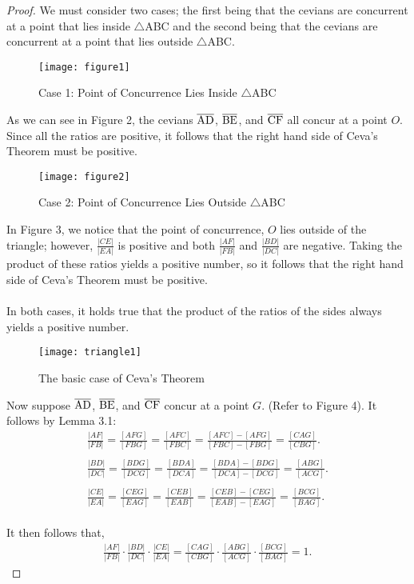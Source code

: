\documentclass[12pt,a4paper,reqno,parskip=full]{amsart}
\numberwithin{equation}{section}
\theoremstyle{plain}
\theoremstyle{definition}
\begin{document}
\begin{proof}
We must consider two cases; the first being that the cevians are concurrent at a point that lies inside $\triangle$ABC and the second being that the cevians are concurrent at a point that lies outside $\triangle$ABC.
\begin{figure}[H]
    \centering
    \texttt{[image: figure1]}
    \caption{Case 1: Point of Concurrence Lies Inside $\triangle$ABC}
    \label{fig:figure1}
\end{figure}

As we can see in Figure 2, the cevians $\overline{\rm AD}$, $\overline{\rm BE}$, and $\overline{\rm CF}$ all concur at a point $O$. Since all the ratios are positive, it follows that the right hand side of Ceva's Theorem must be positive.
\begin{figure}[H]
    \centering
    \texttt{[image: figure2]}
    \caption{Case 2: Point of Concurrence Lies Outside $\triangle$ABC}
    \label{fig:figure2}
\end{figure}

In Figure 3, we notice that the point of concurrence, $O$ lies outside of the triangle; however, $\frac{|CE|}{|EA|}$ is positive and both $\frac{|AF|}{|FB|}$ and $\frac{|BD|}{|DC|}$ are negative. Taking the product of these ratios yields a positive number, so it follows that the right hand side of Ceva's Theorem must be positive.
\\
\\
In both cases, it holds true that the product of the ratios of the sides always yields a positive number.
\\
\begin{figure}[H]
    \centering
    \texttt{[image: triangle1]}
    \caption{The basic case of Ceva's Theorem}
    \label{fig:triangle1}
\end{figure}

Now suppose $\overline{\rm AD}$, $\overline{\rm BE}$, and $\overline{\rm CF}$ concur at a point $G$. (Refer to Figure 4). It follows by Lemma 3.1:
\\
\begin{align*}
\frac{|AF|}{|FB|} = \frac{[AFG]}{[FBG]} = \frac{[AFC]}{[FBC]} = \frac{[AFC] - [AFG]}{[FBC] - [FBG]} = \frac{[CAG]}{[CBG]}.
\\
\\
\frac{|BD|}{|DC|} = \frac{[BDG]}{[DCG]} = \frac{[BDA]}{[DCA]} = \frac{[BDA] - [BDG]}{[DCA] - [DCG]} = \frac{[ABG]}{[ACG]}.
\\
\\
\frac{|CE|}{|EA|} = \frac{[CEG]}{[EAG]} = \frac{[CEB]}{[EAB]} = \frac{[CEB] - [CEG]}{[EAB] - [EAG]} = \frac{[BCG]}{[BAG]}.
\end{align*}
\\
It then follows that,
\\
\begin{align*}
\frac{|AF|}{|FB|}\cdot\frac{|BD|}{|DC|}\cdot\frac{|CE|}{|EA|} = \frac{[CAG]}{[CBG]}\cdot\frac{[ABG]}{[ACG]}\cdot\frac{[BCG]}{[BAG]} = 1.
\end{align*}
\end{proof}
\end{document}
